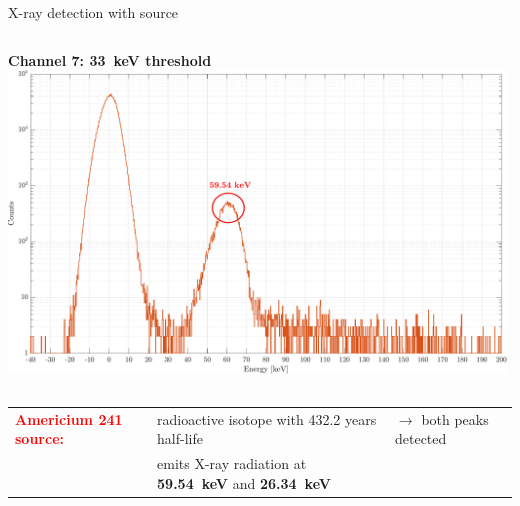 \documentclass[aspectratio=169,xcolor=dvipsnames,handout]{beamer} %
\newcommand\B{\rule[-1.2ex]{0pt}{0pt}} %
\newcommand{\greencheck}{{\color{ForestGreen}\checkmark}}
\begin{document}
\begin{frame}{X-ray detection with  source}
\begin{columns}
            \vskip0.18cm
            \textbf{Channel 7: \SI{33}{\kilo\electronvolt} threshold}
            \vskip0.1cm
            \includegraphics[width=0.99\textwidth]{images/muon_detection/americium/ch4_americio_log_ch7.pdf}  
    \end{columns}
    \fontsize{8.5pt}{1}\selectfont
    \vspace{0.2cm}
    \begin{tabular}{R{3cm} L{6.2cm} L{5cm}}
         \textbf{\textcolor{Red}{Americium 241 source:}} & radioactive isotope with 432.2 years half-life & $\rightarrow$ \hspace{0.2cm} both peaks detected \greencheck \B \\
         & emits X-ray radiation at \textbf{\SI{59.54}{\kilo\electronvolt}} and \textbf{\SI{26.34}{\kilo\electronvolt}}
    \end{tabular}
\end{frame}


\end{document}
